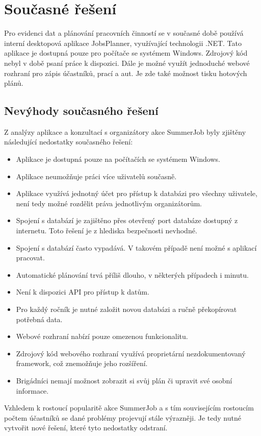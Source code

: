 \chapter{Současné řešení}

Pro evidenci dat a plánování pracovních činností se v současné době používá interní desktopová aplikace JobsPlanner, využívající technologii .NET. Tato aplikace je dostupná pouze pro počítače se systémem
Windows. Zdrojový kód nebyl v době psaní práce k dispozici. Dále je možné využít jednoduché webové rozhraní pro zápis účastníků, prací a aut. Je zde také možnost tisku hotových plánů.

\section{Nevýhody současného řešení}

Z analýzy aplikace a konzultací s organizátory akce SummerJob byly zjištěny následující nedostatky současného řešení:

\begin{itemize}
    \item Aplikace je dostupná pouze na počítačích se systémem Windows.
    \item Aplikace neumožňuje práci více uživatelů současně.
    \item Aplikace využívá jednotný účet pro přístup k databázi pro všechny uživatele, není tedy možné rozdělit práva jednotlivým organizátorům.
    \item Spojení s databází je zajištěno přes otevřený port databáze dostupný z internetu. Toto řešení je z hlediska bezpečnosti nevhodné.
    \item Spojení s databází často vypadává. V takovém případě není možné s aplikací pracovat.
    \item Automatické plánování trvá příliš dlouho, v některých případech i minutu.
    \item Není k dispozici API pro přístup k datům.
    \item Pro každý ročník je nutné založit novou databázi a ručně překopírovat potřebná data.
    \item Webové rozhraní nabízí pouze omezenou funkcionalitu.
    \item Zdrojový kód webového rozhraní využívá proprietární nezdokumentovaný framework, což znemožňuje jeho rozšíření.
    \item Brigádníci nemají možnost zobrazit si svůj plán či upravit své osobní informace.
\end{itemize}

Vzhledem k rostoucí popularitě akce SummerJob a s tím souvisejícím rostoucím počtem účastníků se dané problémy projevují stále výrazněji.
Je tedy nutné vytvořit nové řešení, které tyto nedostatky odstraní.
